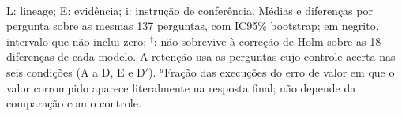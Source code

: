 \begin{table}[t]
{{\begin{tabular}{|l|ccc|}
\hline
\end{tabular}}}
\\[2pt]{\scriptsize\raggedright L: lineage; E: evidência; i: instrução de conferência. Médias e diferenças por pergunta sobre as mesmas 137 perguntas, com IC95\% bootstrap; em negrito, intervalo que não inclui zero; $^{\dagger}$: não sobrevive à correção de Holm sobre as 18 diferenças de cada modelo. A retenção usa as perguntas cujo controle acerta nas seis condições (A a D, E e D$'$). $^{a}$Fração das execuções do erro de valor em que o valor corrompido aparece literalmente na resposta final; não depende da comparação com o controle.\par}
\end{table}
